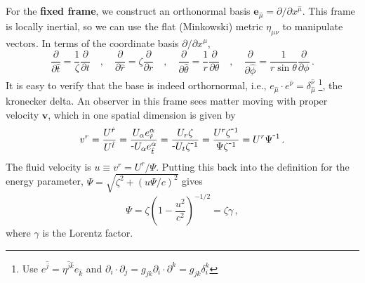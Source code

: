\documentclass[../main.tex]{subfiles}
\begin{document}
For the \textbf{fixed frame}, we construct an orthonormal basis $\bm{e}_{\hat{\mu}}=\partial/\partial x^{\hat{\mu}}$.  This frame is locally inertial, so we can use the flat (Minkowski) metric $\eta_{\mu\nu}$ to manipulate vectors.  In terms of the coordinate basis $\partial/\partial x^{\mu}$,
\begin{equation}\label{eq::fixed_to_coord}
    \frac{\partial}{\partial \hat{t}}=\frac{1}{\zeta}\frac{\partial}{\partial t} 
    \quad,\quad
    \frac{\partial}{\partial \hat{r}}=\zeta\frac{\partial}{\partial r} \quad,\quad
    \frac{\partial}{\partial \hat{\theta}}=\frac{1}{r}\frac{\partial}{\partial \theta} \quad,\quad
    \frac{\partial}{\partial \hat{\phi}}=\frac{1}{r\sin\theta}\frac{\partial}{\partial\phi}\,.
\end{equation}
It is easy to verify that the base is indeed orthornormal, i.e., $e_{\hat{\mu}}\cdot e^{\hat{\nu}}=\delta_{\hat{\mu}}^{\hat{\nu}}\;$\footnote{Use $ e^{\hat{j}}=\eta^{\hat{j}\hat{k}}e_{\hat{k}}$ and $\partial_i\cdot\partial_j=g_{jk}\partial_i\cdot\partial^k=g_{jk}\delta^k_i$}, the kronecker delta.  An observer in this frame sees matter moving with proper velocity $\bm{v}$, which in one spatial dimension is given by
\begin{equation}
    v^r=\frac{U^{\hat{r}}}{U^{\hat{t}}}=\frac{U_\alpha e_{\hat{r}}^\alpha}{\-U_\alpha e_{\hat{t}}^\alpha}=\frac{U_r\zeta}{\-U_t\zeta^{\-1}}=\frac{U^r\zeta^{\-1}}{\Psi\zeta^{\-1}}=U^r\Psi^{\-1} \,.
\end{equation}
The fluid velocity is $u\equiv v^r=U^r/\Psi$. Putting this back into the definition for the energy parameter, $\Psi=\sqrt{\zeta^2+(u\Psi/c)^2}$ gives
\begin{equation}
    \Psi=\zeta\left(1-\frac{u^2}{c^2}\right)^{-1/2}=\zeta\gamma\,,
\end{equation}
where $\gamma$ is the Lorentz factor.
\end{document}
